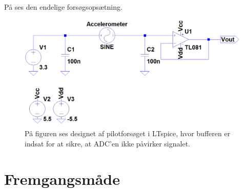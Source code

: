 \noindent På  ses den endelige forsøgsopsætning.
\begin{figure}[H]
	\centering
	\includegraphics[scale=0.4]{figures/Bilag/Acc_medbuffer.png}
	\caption{På figuren ses designet af pilotforsøget i LTspice, hvor bufferen er indsat for at sikre, at ADC'en ikke påvirker signalet.}
	\label{pforsoeg1}
\end{figure}

\section{Fremgangsmåde}
